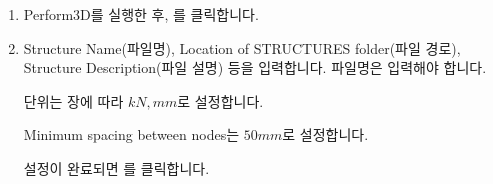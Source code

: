 \documentclass[a4paper,11pt,korean,openany,oneside]{sphinxmanual}
\begin{document}
\begin{sphinxShadowBox}
\begin{enumerate}
%
\item {} 
\sphinxAtStartPar
Perform\sphinxhyphen{}3D를 실행한 후, 를 클릭합니다.

\begin{center}
\noindent{}
\end{center}

\newpage

\item {} 
\sphinxAtStartPar
Structure Name(파일명), Location of STRUCTURES folder(파일 경로), Structure Description(파일 설명) 등을 입력합니다.
파일명은  입력해야 합니다.

\begin{center}
\noindent{}
\end{center}

\sphinxAtStartPar
단위는 {\hyperref[\detokenize{1_unit_setting::doc}]{}} 장에 따라 \(kN, mm\)로 설정합니다.

\sphinxAtStartPar
Minimum spacing between nodes는 \(50 mm\)로 설정합니다.

\sphinxAtStartPar
설정이 완료되면 를 클릭합니다.

\end{enumerate}
\end{sphinxShadowBox}

\newpage
\end{document}
